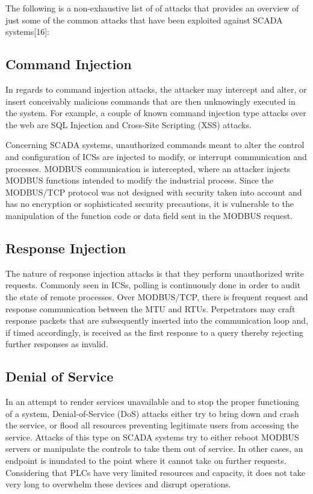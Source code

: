 \documentclass[11pt,a4paper]{article}
\begin{document}
The following is a non-exhaustive list of of attacks that provides an
overview of just some of the common attacks that have been exploited
against SCADA systems{[}16{]}:

\subsection{Command Injection}\label{command-injection}

In regards to command injection attacks, the attacker may intercept and
alter, or insert conceivably malicious commands that are then
unknowingly executed in the system. For example, a couple of known
command injection type attacks over the web are SQL Injection and
Cross-Site Scripting (XSS) attacks.

Concerning SCADA systems, unauthorized commands meant to alter the
control and configuration of ICSs are injected to modify, or interrupt
communication and processes. MODBUS communication is intercepted, where
an attacker injects MODBUS functions intended to modify the industrial
process. Since the MODBUS/TCP protocol was not designed with security
taken into account and has no encryption or sophisticated security
precautions, it is vulnerable to the manipulation of the function code
or data field sent in the MODBUS request.

\subsection{Response Injection}\label{response-injection}

The nature of response injection attacks is that they perform
unauthorized write requests. Commonly seen in ICSs, polling is
continuously done in order to audit the state of remote processes. Over
MODBUS/TCP, there is frequent request and response communication between
the MTU and RTUs. Perpetrators may craft response packets that are
subsequently inserted into the communication loop and, if timed
accordingly, is received as the first response to a query thereby
rejecting further responses as invalid.

\subsection{Denial of Service}\label{denial-of-service}

In an attempt to render services unavailable and to stop the proper
functioning of a system, Denial-of-Service (DoS) attacks either try to
bring down and crash the service, or flood all resources preventing
legitimate users from accessing the service. Attacks of this type on
SCADA systems try to either reboot MODBUS servers or manipulate the
controls to take them out of service. In other cases, an endpoint is
inundated to the point where it cannot take on further requests.
Considering that PLCs have very limited resources and capacity, it does
not take very long to overwhelm these devices and disrupt operations.
\end{document}

